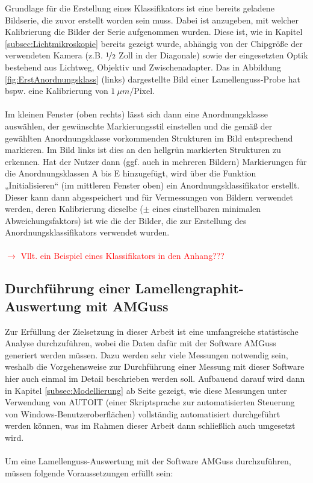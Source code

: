 \documentclass[
fontsize=10pt, 
listof = totoc,
parskip = half	
]{report}
\begin{document}
\noindent Grundlage für die Erstellung eines Klassifikators ist eine bereits geladene Bildserie, die zuvor erstellt worden sein muss. Dabei ist anzugeben, mit welcher Kalibrierung  die Bilder der Serie aufgenommen wurden. Diese ist, wie in Kapitel \ref{subsec:Lichtmikroskopie} bereits gezeigt wurde,  abhängig von der Chipgröße der verwendeten Kamera (z.B. $\nicefrac{1}{2}$ Zoll in der Diagonale)  sowie der eingesetzten Optik bestehend aus Lichtweg, Objektiv und Zwischenadapter. Das in Abbildung \ref{fig:ErstAnordnungsklass} (links) dargestellte Bild einer Lamellenguss-Probe hat bspw. eine Kalibrierung von $1~\mu m/\text{Pixel}$. 
\\\\
Im kleinen Fenster (oben rechts) lässt sich dann eine Anordnungsklasse auswählen, der gewünschte Markierungsstil einstellen und die gemäß der gewählten Anordnungsklasse vorkommenden Strukturen im Bild entsprechend markieren. Im Bild links ist dies an den hellgrün markierten Strukturen zu erkennen. Hat der Nutzer dann (ggf. auch in mehreren Bildern) Markierungen für die Anordnungsklassen A bis E hinzugefügt, wird über die Funktion „Initialisieren“ (im mittleren Fenster oben) ein Anordnungsklassifikator erstellt. Dieser kann dann abgespeichert und für Vermessungen von Bildern verwendet werden, deren Kalibrierung dieselbe ($\pm$ eines einstellbaren minimalen Abweichungsfaktors) ist wie die der Bilder, die zur Erstellung des Anordnungsklassifikators verwendet wurden. 
\\\\
\textcolor{red}{$\to$ Vllt. ein Beispiel eines Klassifikators in den Anhang???}

\subsection{Durchführung einer Lamellengraphit-Auswertung mit AMGuss}
\label{subsec:LamelloGraphMesssung}
Zur Erfüllung der Zielsetzung in dieser Arbeit ist eine umfangreiche statistische Analyse durchzuführen, wobei die Daten dafür mit der Software AMGuss generiert werden müssen. Dazu werden sehr viele Messungen notwendig sein, weshalb die Vorgehensweise zur Durchführung einer Messung mit dieser Software hier auch einmal im Detail beschrieben werden soll. Aufbauend darauf wird dann in Kapitel \ref{subsec:Modellierung} ab Seite \pageref{subsec:Modellierung} gezeigt, wie diese Messungen unter Verwendung von AUTOIT (einer Skriptsprache zur automatisierten Steuerung von Windows-Benutzeroberflächen) vollständig automatisiert durchgeführt werden können, was im Rahmen dieser Arbeit dann schließlich auch umgesetzt wird.
\\\\
Um eine Lamellenguss-Auswertung mit der Software AMGuss durchzuführen, müssen folgende Voraussetzungen erfüllt sein:
\end{document}

